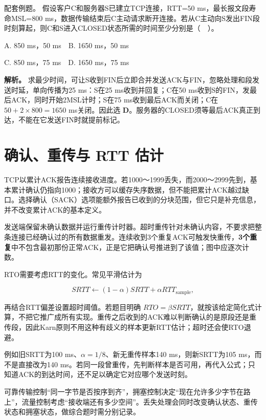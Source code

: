 \begin{example}[配套例题]

配套例题。 假设客户C和服务器S已建立TCP连接，RTT=50 ms，最长报文段寿命MSL=800 ms，数据传输结束后C主动请求断开连接。若从C主动向S发出FIN段时刻算起，则C和S进入CLOSED状态所需的时间至少分别是（　）。

A. 850 ms，50 ms　B. 1650 ms，50 ms

C. 850 ms，75 ms　D. 1650 ms，75 ms

\end{example}

\textbf{解析。} 求最少时间，可让S收到FIN后立即合并发送ACK与FIN，忽略处理和段发送时延，单向传播为25 ms：S在25 ms收到并回复；C在50 ms收到S的FIN，发最后ACK，同时开始2MSL计时；S在75 ms收到最后ACK而关闭；C在 \(50+2\times800=1650\) ms关闭。因此选 \textbf{D}。服务器的CLOSED须等最后ACK真正到达，不能在它发送FIN时就提前标记。

\section{确认、重传与 RTT 估计}\label{CN05-06}

TCP以累计ACK报告连续接收进度。若1000～1999丢失，而2000～2999先到，基本累计确认仍指向1000；接收方可以缓存失序数据，但不能把累计ACK越过缺口。选择确认（SACK）选项能额外报告已收到的分块范围，但它只是补充信息，并不改变累计ACK的基本定义。

发送端保留未确认数据并运行重传计时器。超时重传针对未确认内容，不要求把整条连接已经确认过的所有数据重发。连续收到3个重复ACK可触发快重传，\textbf{3个重复}中不包含最初那份正常ACK，正是它把确认号推进到了该值；图中应逐次计数。

RTO需要考虑RTT的变化。常见平滑估计为

\[SRTT\leftarrow(1-\alpha)SRTT+\alpha RTT_{\mathrm{sample}},\]

再结合RTT偏差设置超时阈值。若题目明确 \(RTO=\beta SRTT\)，就按该给定简化式计算，不把它推广成所有实现。重传之后收到的ACK难以判断确认的是原段还是重传段，因此Karn原则不用这种有歧义的样本更新RTT估计；超时还会使RTO退避。

例如旧SRTT为100 ms、\(\alpha=1/8\)、新无重传样本140 ms，则新SRTT为105 ms，而不是直接改为140 ms。若同一段曾重传，先判断样本是否可用，再代入公式；只知道ACK的到达时间，还不足以确定它对应哪个发送时刻。

可靠传输控制``同一字节是否按序到齐''，拥塞控制决定``现在允许多少字节在路上''，流量控制考虑``接收端还有多少空间''。丢失处理会同时改变确认状态、重传状态和拥塞状态，做综合题时需分别记录。

